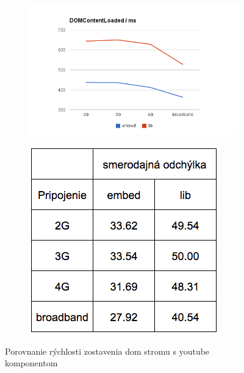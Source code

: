 \begin{figure}[H]
  \centering
  \begin{subfigure}[b]{0.6\textwidth}
          \includegraphics[width=\textwidth]{img/load/youtube-dom.png}
  \end{subfigure}%
  \begin{subfigure}[b]{0.32\textwidth}
          \includegraphics[width=\textwidth]{img/load/y-std-dom.png}
  \end{subfigure}%
  \caption[Porovnanie rýchlosti zostavenia dom stromu s youtube komponentom]{
    Porovnanie rýchlosti zostavenia dom stromu s youtube komponentom}
  \label{fig: youtube-dom}
\end{figure}



